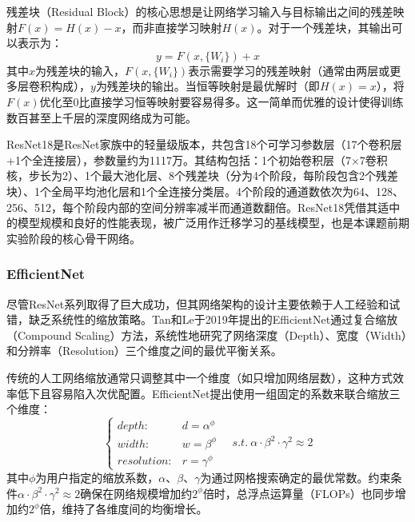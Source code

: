 残差块（Residual Block）的核心思想是让网络学习输入与目标输出之间的残差映射$F(x) = H(x) - x$，而非直接学习映射$H(x)$。对于一个残差块，其输出可以表示为：
\begin{equation}
    \label{eq:resnet}
    y = F(x, \{W_i\}) + x
\end{equation}
其中$x$为残差块的输入，$F(x, \{W_i\})$表示需要学习的残差映射（通常由两层或更多层卷积构成），$y$为残差块的输出。当恒等映射是最优解时（即$H(x) = x$），将$F(x)$优化至0比直接学习恒等映射要容易得多。这一简单而优雅的设计使得训练数百甚至上千层的深度网络成为可能。

ResNet18是ResNet家族中的轻量级版本，共包含18个可学习参数层（17个卷积层+1个全连接层），参数量约为1117万。其结构包括：1个初始卷积层（7$\times$7卷积核，步长为2）、1个最大池化层、8个残差块（分为4个阶段，每阶段包含2个残差块）、1个全局平均池化层和1个全连接分类层。4个阶段的通道数依次为64、128、256、512，每个阶段内部的空间分辨率减半而通道数翻倍。ResNet18凭借其适中的模型规模和良好的性能表现，被广泛用作迁移学习的基线模型，也是本课题前期实验阶段的核心骨干网络。

\subsubsection{EfficientNet}

尽管ResNet系列取得了巨大成功，但其网络架构的设计主要依赖于人工经验和试错，缺乏系统性的缩放策略。Tan和Le\cite{tan2019efficientnet}于2019年提出的EfficientNet通过复合缩放（Compound Scaling）方法，系统性地研究了网络深度（Depth）、宽度（Width）和分辨率（Resolution）三个维度之间的最优平衡关系。

传统的人工网络缩放通常只调整其中一个维度（如只增加网络层数），这种方式效率低下且容易陷入次优配置。EfficientNet提出使用一组固定的系数来联合缩放三个维度：
\begin{equation}
    \label{eq:efficientnet}
    \begin{cases}
        depth: & d = \alpha^\phi \\
        width: & w = \beta^\phi \\
        resolution: & r = \gamma^\phi
    \end{cases}
    \quad s.t. \ \alpha \cdot \beta^2 \cdot \gamma^2 \approx 2
\end{equation}
其中$\phi$为用户指定的缩放系数，$\alpha$、$\beta$、$\gamma$为通过网格搜索确定的最优常数。约束条件$\alpha \cdot \beta^2 \cdot \gamma^2 \approx 2$确保在网络规模增加约$2^\phi$倍时，总浮点运算量（FLOPs）也同步增加约$2^\phi$倍，维持了各维度间的均衡增长。

